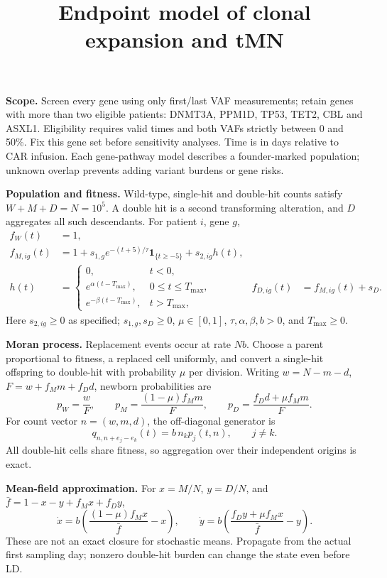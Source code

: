 \documentclass[10pt]{article}
\title{\vspace{-1.5em}Endpoint model of clonal expansion and tMN}
\author{}\date{}
\begin{document}
\maketitle\vspace{-2.8em}
\textbf{Scope.} Screen every gene using only first/last VAF measurements; retain genes with more than two eligible patients: DNMT3A, PPM1D, TP53, TET2, CBL and ASXL1. Eligibility requires valid times and both VAFs strictly between 0 and 50\%. Fix this gene set before sensitivity analyses. Time is in days relative to CAR infusion. Each gene-pathway model describes a founder-marked population; unknown overlap prevents adding variant burdens or gene risks.

\textbf{Population and fitness.} Wild-type, single-hit and double-hit counts satisfy
\(W+M+D=N=10^5\). A double hit is a second transforming alteration, and \(D\) aggregates all such descendants. For patient \(i\), gene \(g\),
\begin{align}
 f_W(t)&=1, \\
 f_{M,ig}(t)&=1+s_{1,g}e^{-(t+5)/\tau}\mathbf1_{\{t\ge-5\}}+s_{2,ig}h(t),\\
 h(t)&=\begin{cases}
 0,&t<0,\\
 e^{\alpha(t-T_{\max})},&0\le t\le T_{\max},\\
 e^{-\beta(t-T_{\max})},&t>T_{\max},
 \end{cases}
 & f_{D,ig}(t)&=f_{M,ig}(t)+s_D .
\end{align}
Here \(s_{2,ig}\ge0\) as specified; \(s_{1,g},s_D\ge0\), \(\mu\in[0,1]\), \(\tau,\alpha,\beta,b>0\), and \(T_{\max}\ge0\).

\textbf{Moran process.} Replacement events occur at rate \(Nb\). Choose a parent proportional to fitness, a replaced cell uniformly, and convert a single-hit offspring to double-hit with probability \(\mu\) per division. Writing \(w=N-m-d\), \(F=w+f_Mm+f_Dd\), newborn probabilities are
\[
p_W=\frac{w}{F},\qquad
p_M=\frac{(1-\mu)f_Mm}{F},\qquad
p_D=\frac{f_Dd+\mu f_Mm}{F}.
\]
For count vector \(n=(w,m,d)\), the off-diagonal generator is
\[
q_{n,n+e_j-e_k}(t)=b\,n_kp_j(t,n),\qquad j\ne k.
\]
All double-hit cells share fitness, so aggregation over their independent origins is exact.

\textbf{Mean-field approximation.} For \(x=M/N\), \(y=D/N\), and
\(\bar f=1-x-y+f_Mx+f_Dy\),
\[
\dot x=b\left(\frac{(1-\mu)f_Mx}{\bar f}-x\right),\qquad
\dot y=b\left(\frac{f_Dy+\mu f_Mx}{\bar f}-y\right).
\]
These are not an exact closure for stochastic means. Propagate from the actual first sampling day; nonzero double-hit burden can change the state even before LD.
\end{document}
